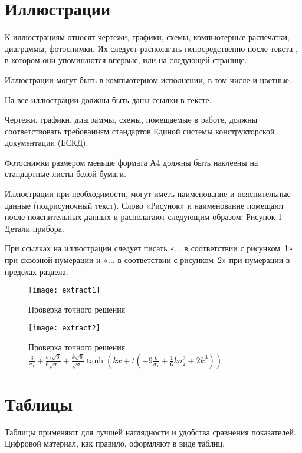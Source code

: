 \documentclass[14pt]{extreport}
\begin{document}
\section{Иллюстрации}

К иллюстрациям относят чертежи, графики, схемы, компьютерные распечатки,
диаграммы, фотоснимки. Их следует располагать непосредственно после текста , в
котором они упоминаются впервые, или на следующей странице.

Иллюстрации могут быть в компьютерном исполнении, в том числе и цветные.

На все иллюстрации должны быть даны ссылки в тексте.

Чертежи, графики, диаграммы, схемы, помещаемые в работе, должны
соответствовать требованиям стандартов Единой системы конструкторской
документации (ЕСКД).

Фотоснимки размером меньше формата А4 должны быть наклеены на стандартные листы
белой бумаги.

Иллюстрации при необходимости, могут иметь наименование и пояснительные данные
(подрисуночный текст). Слово «Рисунок» и наименование помещают после
пояснительных данных и располагают следующим образом: Рисунок 1 - Детали
прибора.

При ссылках на иллюстрации следует писать «... в соответствии с рисунком~\ref{fig11}» 
при сквозной нумерации и «... в соответствии с рисунком~\ref{fig12}» при нумерации в
пределах раздела.

\begin{figure}[H]
\centerline{\texttt{[image: extract1]}}
\caption{Проверка точного решения}
\label{fig11}
\end{figure}

\begin{landscape}
\begin{figure}[H]
\centerline{\texttt{[image: extract2]}}
\caption{
Проверка точного решения $\frac{3}{\sigma_{1}} + \frac{\sigma_{2} \sqrt{6}}{6 \sqrt{\sigma_{1}}} 
 + \frac{k \sqrt{6}}{\sqrt{\sigma_{1}}}\operatorname{tanh}\left(
k x + t \left(- 9 \frac{k}{\sigma_{1}} + \frac{1}{6} k \sigma_{2}^{2} + 2 k^{3}\right)\right)
$}
\label{fig12}
\end{figure}
\end{landscape}

\section{Таблицы}
Таблицы применяют для лучшей наглядности и удобства сравнения показателей. 
Цифровой материал, как правило, оформляют в виде таблиц.
\end{document}
